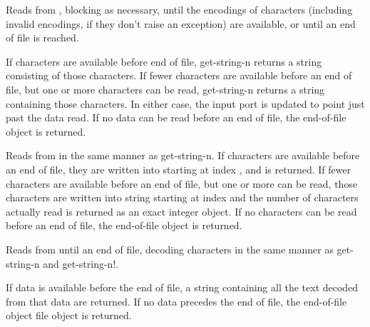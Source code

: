 \begin{entry}{%
}
   

Reads from , blocking as necessary, until the
encodings of  characters (including invalid encodings, if they
don't raise an exception) are available, or until an end of
file is reached.
   
If  characters are available before end of file, {\cf
  get-string-n} returns a string consisting of those 
characters. If fewer characters are available before an end of file,
but one or more characters can be read,
{\cf get-string-n} returns a string containing
those characters. In either case, the input port is updated to point
just past the data read. If no data can be read before an 
end of file, the end-of-file object is returned.
\end{entry}

\begin{entry}{%
}


Reads from  in the same manner as {\cf
  get-string-n}.  If  characters are available
before an end of file, they are written into 
starting at index , and  is returned. If fewer
characters are available before an end of file, but one
or more can be read, those characters are written into string
starting at index  and the number of characters actually read is
returned as an exact integer object. If no characters can be read before an end of file,
the end-of-file object is returned.
\end{entry}   

\begin{entry}{%
}
   
Reads from  until an end of file, decoding
characters in the same manner as {\cf get-string-n} and {\cf get-string-n!}.
   
If data is available before the end of file, a string
containing all the text decoded from that data are returned. If no data
precedes the end of file, the end-of-file object file object is
returned.
\end{entry}

